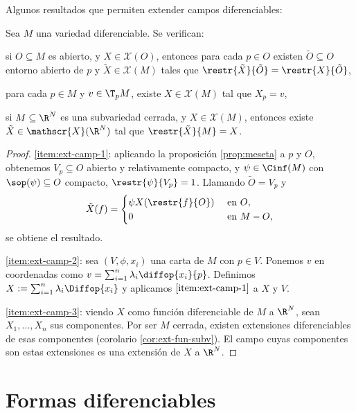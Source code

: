 Algunos resultados que permiten extender campos diferenciables:
\begin{nprop}
  Sea $M$ una variedad diferenciable. Se verifican:
  \begin{nlist}
  \item \label{item:ext-camp-1}
    si $O\subseteq M$ es abierto, y $X\in \mathscr{X}(O)$, entonces para cada
    $p\in O$ existen $\tilde{O}\subseteq O$ entorno abierto de $p$ y
    $\tilde{X}\in \mathscr{X}(M)$ tales que $\restr{\tilde{X}}{\tilde{O}} =
    \restr{X}{\tilde{O}}$,
  \item \label{item:ext-camp-2}
    para cada $p\in M$ y $v\in \T_{p}M$, existe $X\in \mathscr{X}(M)$ tal que
    $X_{p}=v$,
  \item \label{item:ext-camp-3}
    si $M\subseteq \R^{N}$ es una subvariedad cerrada, y $X\in \mathscr{X}(M)$,
    entonces existe $\tilde{X}\in \mathscr{X}(\R^{N})$ tal que
    $\restr{\tilde{X}}{M} = X$.
  \end{nlist}
\end{nprop}
\begin{proof}
  \ref{item:ext-camp-1}: aplicando la proposición \ref{prop:meseta} a $p$ y $O$,
  obtenemos $V_{p}\subseteq O$ abierto y relativamente compacto, y
  $\psi\in\Cinf(M)$ con $\sop(\psi)\subseteq O$ compacto, $\restr{\psi}{V_{p}} =
  1$. Llamando $\tilde{O} = V_{p}$ y
  \[
    \tilde{X}(f) =
    \begin{cases}
      \psi X(\restr{f}{O}) & \text{ en $O$}, \\
      0 & \text{ en $M-O$},
    \end{cases}
    \] se obtiene el resultado.

    \ref{item:ext-camp-2}: sea $(V,\phi,x_{i})$ una carta de $M$ con $p\in
    V$. Ponemos $v$ en coordenadas como $v =
    \sum_{i=1}^{n}\lambda_{i}\diffop{x_{i}}{p}$. Definimos $X:=
    \sum_{i=1}^{n}\lambda_{i}\Diffop{x_{i}}$ y aplicamos $\ref{item:ext-camp-1}$
    a $X$ y $V$.

    \ref{item:ext-camp-3}: viendo $X$ como función diferenciable de $M$ a
    $\R^{N}$, sean $X_{1}, \dots, X_{n}$ sus componentes. Por ser $M$ cerrada,
    existen extensiones diferenciables de esas componentes (corolario
    \ref{cor:ext-fun-subv}). El campo cuyas componentes son estas extensiones es
    una extensión de $X$ a $\R^{N}$.
\end{proof}

\section{Formas diferenciables}

